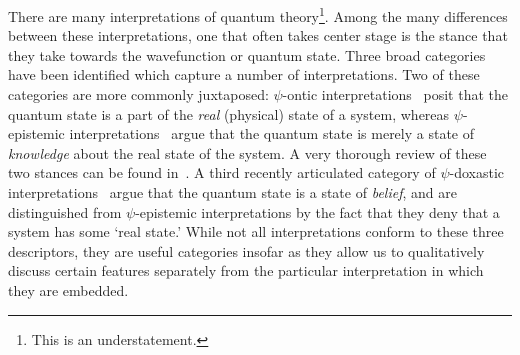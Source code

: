 \documentclass[%
 reprint, onecolumn, 12pt,
superscriptaddress,
nofootinbib,
 prx, 
]{quantumarticle}
\begin{document}
There are many interpretations of quantum theory\footnote{This is an
  understatement.}. Among the many differences between these
interpretations, one that often takes center stage is the stance that
they take towards the wavefunction or quantum state.  Three broad
categories have been identified which capture a number of
interpretations.  Two of these categories are more commonly
juxtaposed: $\psi$-ontic
interpretations~\cite{BohmSuggestedInterpretationQuantum1952,EverettRelativeStateFormulation1957,DiracPrinciplesQuantumMechanics1958,GhirardiUnifieddynamicsmicroscopic1986,PearleCombiningstochasticdynamical1989,Valentinipilotwavetheoryclassical1991,
  BohmUndividedUniverse1993,HollandQuantumTheoryMotion1993,Beltrametticlassicalextensionquantum1995,DieksModalInterpretationQuantum1998,PearleCollapsemodels1999,BarrettQuantumMechanicsMinds1999,LombardiModalInterpretationsQuantum,BassiModelswavefunctioncollapse2013}
posit that the quantum state is a part of the \emph{real} (physical)
state of a system, whereas $\psi$-epistemic
interpretations~\cite{EinsteinCanQuantumMechanicalDescription1935,KochenProblemHiddenVariables1967,BallentineStatisticalInterpretationQuantum1970,HowardEinsteinlocalityseparability1985,BallentineInadequacyEhrenfesttheorem1994,EmersonQuantumChaosQuantumClassical2002,RudolphOntologicalModelsQuantum2006,Spekkensdefenseepistemicview2007,HarriganEinsteinincompletenessepistemic2010}
argue that the quantum state is merely a state of \emph{knowledge}
about the real state of the system. A very thorough review of these
two stances can be found in~\cite{Leiferquantumstatereal2014}. A third
recently articulated category of $\psi$-doxastic
interpretations~\cite{CabelloInterpretationsquantumtheory2017,SchackParticipatoryrealism2016,WernerHeisenbergPhysicsPhilosophy1958,FuchsintroductionQBismapplication2014,RovelliRelationalquantummechanics1996,HealeyQuantumTheoryPragmatist2010,BubWhyBohrwas2017}
argue that the quantum state is a state of \emph{belief}, and are
distinguished from $\psi$-epistemic interpretations by the fact that
they deny that a system has some `real state.' While not all
interpretations conform to these three descriptors, they are useful
categories insofar as they allow us to qualitatively discuss certain
features separately from the particular interpretation in which they
are embedded.
\end{document}
